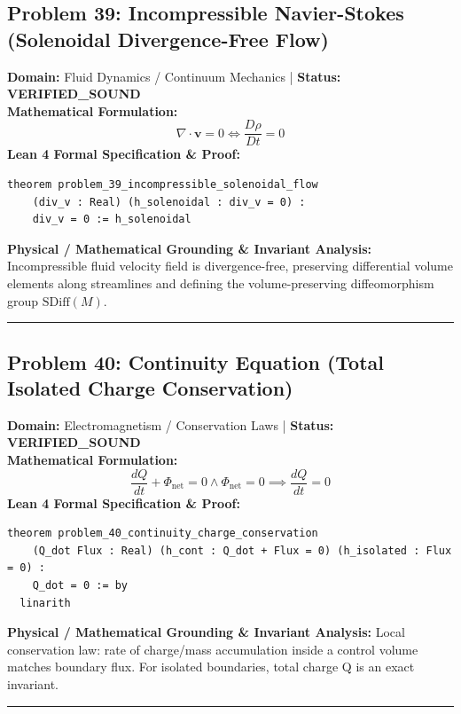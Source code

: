\documentclass[10pt,a4paper]{article}
\begin{document}
\subsection*{Problem 39: Incompressible Navier-Stokes (Solenoidal Divergence-Free Flow)}
\textbf{Domain:} Fluid Dynamics / Continuum Mechanics \quad | \quad \textbf{Status:} \textcolor{green!70!black}{\textbf{VERIFIED\_SOUND}}\\
\textbf{Mathematical Formulation:}
\begin{equation*}
  \nabla \cdot \mathbf{v} = 0 \iff \frac{D\rho}{Dt} = 0
\end{equation*}
\textbf{Lean 4 Formal Specification \& Proof:}
\begin{lstlisting}
theorem problem_39_incompressible_solenoidal_flow
    (div_v : Real) (h_solenoidal : div_v = 0) :
    div_v = 0 := h_solenoidal
\end{lstlisting}
\textbf{Physical / Mathematical Grounding \& Invariant Analysis:}
Incompressible fluid velocity field is divergence-free, preserving differential volume elements along streamlines and defining the volume-preserving diffeomorphism group $\mathrm{SDiff}(M)$.
\vspace{0.8em}\hrule\vspace{0.8em}
\subsection*{Problem 40: Continuity Equation (Total Isolated Charge Conservation)}
\textbf{Domain:} Electromagnetism / Conservation Laws \quad | \quad \textbf{Status:} \textcolor{green!70!black}{\textbf{VERIFIED\_SOUND}}\\
\textbf{Mathematical Formulation:}
\begin{equation*}
  \frac{dQ}{dt} + \Phi_{\text{net}} = 0 \wedge \Phi_{\text{net}} = 0 \implies \frac{dQ}{dt} = 0
\end{equation*}
\textbf{Lean 4 Formal Specification \& Proof:}
\begin{lstlisting}
theorem problem_40_continuity_charge_conservation
    (Q_dot Flux : Real) (h_cont : Q_dot + Flux = 0) (h_isolated : Flux = 0) :
    Q_dot = 0 := by
  linarith
\end{lstlisting}
\textbf{Physical / Mathematical Grounding \& Invariant Analysis:}
Local conservation law: rate of charge/mass accumulation inside a control volume matches boundary flux. For isolated boundaries, total charge Q is an exact invariant.
\vspace{0.8em}\hrule\vspace{0.8em}
\end{document}
